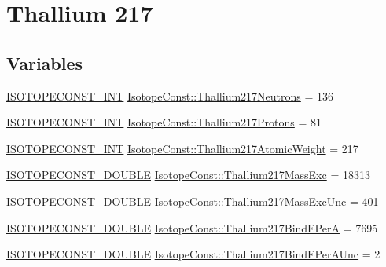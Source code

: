 \hypertarget{group___isotope_const-_thallium-_tl217}{}\section{Thallium 217}
\label{group___isotope_const-_thallium-_tl217}
\subsection*{Variables}
\begin{DoxyCompactItemize}
\item 
\mbox{\hyperlink{group___isotope_const-_macros_ga5f18360b3e99483a35c32d789e62621c}{I\+S\+O\+T\+O\+P\+E\+C\+O\+N\+S\+T\+\_\+\+I\+NT}} \mbox{\hyperlink{group___isotope_const-_thallium-_tl217_gaba905167ac3241dca134992c13e02c37}{Isotope\+Const\+::\+Thallium217\+Neutrons}} = 136
\item 
\mbox{\hyperlink{group___isotope_const-_macros_ga5f18360b3e99483a35c32d789e62621c}{I\+S\+O\+T\+O\+P\+E\+C\+O\+N\+S\+T\+\_\+\+I\+NT}} \mbox{\hyperlink{group___isotope_const-_thallium-_tl217_gaffc8fc7ebc26fda64d52df7e4a403398}{Isotope\+Const\+::\+Thallium217\+Protons}} = 81
\item 
\mbox{\hyperlink{group___isotope_const-_macros_ga5f18360b3e99483a35c32d789e62621c}{I\+S\+O\+T\+O\+P\+E\+C\+O\+N\+S\+T\+\_\+\+I\+NT}} \mbox{\hyperlink{group___isotope_const-_thallium-_tl217_ga38c4b06ea813aa3a3a7f8241d88e3a68}{Isotope\+Const\+::\+Thallium217\+Atomic\+Weight}} = 217
\item 
\mbox{\hyperlink{group___isotope_const-_macros_ga8f45a7272ce02c0b4c65c44636ed719a}{I\+S\+O\+T\+O\+P\+E\+C\+O\+N\+S\+T\+\_\+\+D\+O\+U\+B\+LE}} \mbox{\hyperlink{group___isotope_const-_thallium-_tl217_ga3e5ada4479ed86f1e79dc4f94006e35f}{Isotope\+Const\+::\+Thallium217\+Mass\+Exc}} = 18313
\item 
\mbox{\hyperlink{group___isotope_const-_macros_ga8f45a7272ce02c0b4c65c44636ed719a}{I\+S\+O\+T\+O\+P\+E\+C\+O\+N\+S\+T\+\_\+\+D\+O\+U\+B\+LE}} \mbox{\hyperlink{group___isotope_const-_thallium-_tl217_ga82ee10a7dfd7dd322b557824e4172a26}{Isotope\+Const\+::\+Thallium217\+Mass\+Exc\+Unc}} = 401
\item 
\mbox{\hyperlink{group___isotope_const-_macros_ga8f45a7272ce02c0b4c65c44636ed719a}{I\+S\+O\+T\+O\+P\+E\+C\+O\+N\+S\+T\+\_\+\+D\+O\+U\+B\+LE}} \mbox{\hyperlink{group___isotope_const-_thallium-_tl217_ga20efd6f1e8b7b7e614a0a3a637fe892f}{Isotope\+Const\+::\+Thallium217\+Bind\+E\+PerA}} = 7695
\item 
\mbox{\hyperlink{group___isotope_const-_macros_ga8f45a7272ce02c0b4c65c44636ed719a}{I\+S\+O\+T\+O\+P\+E\+C\+O\+N\+S\+T\+\_\+\+D\+O\+U\+B\+LE}} \mbox{\hyperlink{group___isotope_const-_thallium-_tl217_ga04066d072610360bf75aa1b0c18b980b}{Isotope\+Const\+::\+Thallium217\+Bind\+E\+Per\+A\+Unc}} = 2

\end{DoxyCompactItemize}

